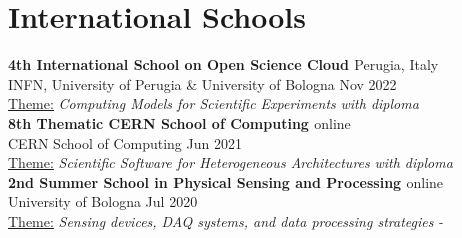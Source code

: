\newcommand{\event}[2]
  {\normalsize \textbf{\color{hlcolor-0} #1} \hfill {\color{hlcolor-2} #2}}

\newcommand{\organizer}[2]
  {\small \color{hlcolor-1} {#1} \hfill {#2}}

\newcommand{\theme}[1]
  {\normalsize \color{maincolor} \ul{Theme:} \emph{#1}}

\newcommand{\outcome}[1]
  {\normalsize \color{hlcolor-2} \emph{#1}}
  

\section*{International Schools}
\begin{cvcontent}
  \event{4th International School on Open Science Cloud 
    \href{https://agenda.infn.it/event/31408}{\faGlobe}}
    {Perugia, Italy}\\ [0.5mm]
  \organizer{INFN, University of Perugia \& University of Bologna}
    {Nov 2022}\\ [0.5mm]
  \theme{Computing Models for Scientific Experiments}
    \hfill \outcome{with diploma}
   \\ [4mm]
  \event{8th Thematic CERN School of Computing
    \href{https://indico.cern.ch/event/1017080}{\faGlobe}}
    {online}\\ [0.5mm]
  \organizer{CERN School of Computing}{Jun 2021}\\ [0.5mm]
  \theme{Scientific Software for Heterogeneous Architectures}
    \hfill \hfill \outcome{with diploma}
  \\ [4mm]
  \event{2nd Summer School in Physical Sensing and Processing
    \href{https://site.unibo.it/school-physical-sensing-and-processing/en/past-editions/2nd-edition-20-24-july-2020}{\faGlobe}}
    {online}\\ [0.5mm]
  \organizer{University of Bologna}{Jul 2020}\\ [0.5mm]
  \theme{Sensing devices, DAQ systems, and data processing strategies}
    \hfill \hfill \outcome{-}
\end{cvcontent}